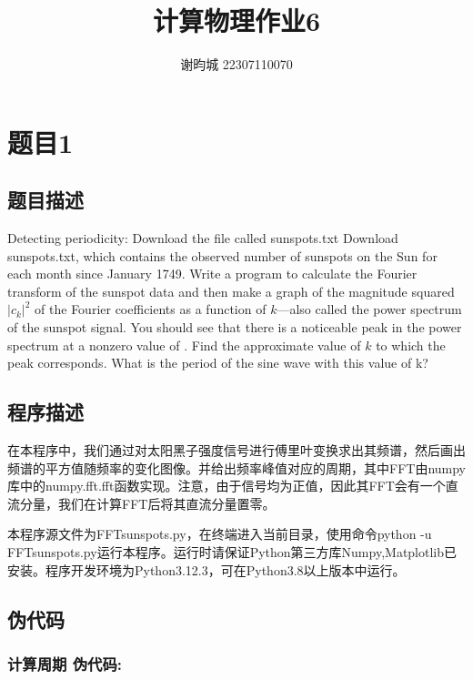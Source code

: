 \documentclass[11pt]{article}
\author{谢昀城 22307110070}
\title{计算物理作业6}
\begin{document}
\maketitle




  \section{题目1}
  \subsection{题目描述}
  
  Detecting periodicity: Download the file called sunspots.txt Download sunspots.txt, which contains the observed number of sunspots on the Sun for each month since January 1749. Write a program to calculate the Fourier transform of the sunspot data and then make a graph of the magnitude squared $|c_k|^2$ 
  of the Fourier coefficients as a function of 
  $k$—also called the power spectrum of the sunspot signal. You should see that there is a noticeable peak in the power spectrum at a nonzero value of 
 . Find the approximate value of $k$
  to which the peak corresponds. What is the period of the sine wave with this value of k?


\subsection{程序描述}
   在本程序中，我们通过对太阳黑子强度信号进行傅里叶变换求出其频谱，然后画出频谱的平方值随频率的变化图像。并给出频率峰值对应的周期，其中FFT由numpy库中的numpy.fft.fft函数实现。注意，由于信号均为正值，因此其FFT会有一个直流分量，我们在计算FFT后将其直流分量置零。

本程序源文件为FFTsunspots.py，在终端进入当前目录，使用命令python -u FFTsunspots.py运行本程序。运行时请保证Python第三方库Numpy,Matplotlib已安装。程序开发环境为Python3.12.3，可在Python3.8以上版本中运行。

\subsection{伪代码}
\subsubsection{计算周期 伪代码:}
\end{document}
